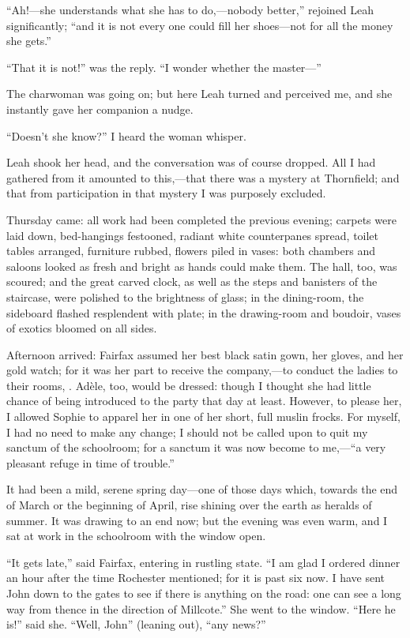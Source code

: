\enquote{Ah!---she understands what she has to do,---nobody better,}
rejoined Leah significantly; \enquote{and it is not every one could fill
her shoes---not for all the money she gets.}

\enquote{That it is not!} was the reply. \enquote{I wonder whether the
master---}

The charwoman was going on; but here Leah turned and perceived me, and
she instantly gave her companion a nudge.

\enquote{Doesn't she know?} I heard the woman whisper.

Leah shook her head, and the conversation was of course dropped. All I
had gathered from it amounted to this,---that there was a mystery at
Thornfield; and that from participation in that mystery I was purposely
excluded.

Thursday came: all work had been completed the previous evening; carpets
were laid down, bed-hangings festooned, radiant white counterpanes
spread, toilet tables arranged, furniture rubbed, flowers piled in
vases: both chambers and saloons looked as fresh and bright as hands
could make them. The hall, too, was scoured; and the great carved
clock, as well as the steps and banisters of the staircase, were
polished to the brightness of glass; in the dining-room, the sideboard
flashed resplendent with plate; in the drawing-room and boudoir, vases
of exotics bloomed on all sides.

Afternoon arrived: \Mrs{} Fairfax assumed her best black satin gown, her
gloves, and her gold watch; for it was her part to receive the
company,---to conduct the ladies to their rooms, \etc. Adèle, too, would
be dressed: though I thought she had little chance of being introduced
to the party that day at least. However, to please her, I allowed
Sophie to apparel her in one of her short, full muslin frocks. For
myself, I had no need to make any change; I should not be called upon to
quit my sanctum of the schoolroom; for a sanctum it was now become to
me,---\enquote{a very pleasant refuge in time of trouble.}

It had been a mild, serene spring day---one of those days which, towards
the end of March or the beginning of April, rise shining over the earth
as heralds of summer. It was drawing to an end now; but the evening was
even warm, and I sat at work in the schoolroom with the window open.

\enquote{It gets late,} said \Mrs{} Fairfax, entering in rustling state. 
\enquote{I am glad I ordered dinner an hour after the time \Mr{} Rochester
mentioned; for it is past six now. I have sent John down to the gates
to see if there is anything on the road: one can see a long way from
thence in the direction of Millcote.} She went to the window. 
\enquote{Here he is!} said she. \enquote{Well, John} (leaning out),
\enquote{any news?}

